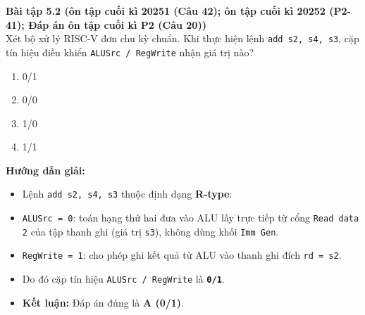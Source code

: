 \textbf{Bài tập 5.2 (ôn tập cuối kì 20251 (Câu 42); ôn tập cuối kì 20252 (P2-41); Đáp án ôn tập cuối kì P2 (Câu 20))}\\
Xét bộ xử lý RISC-V đơn chu kỳ chuẩn. Khi thực hiện lệnh \texttt{add s2, s4, s3}, cặp tín hiệu điều khiển \texttt{ALUSrc / RegWrite} nhận giá trị nào?
\begin{enumerate}[label=\Alph*.]
    \item 0/1
    \item 0/0
    \item 1/0
    \item 1/1
\end{enumerate}
\textbf{Hướng dẫn giải:}
\begin{itemize}
    \item Lệnh \texttt{add s2, s4, s3} thuộc định dạng \textbf{R-type}:
    \item \texttt{ALUSrc = 0}: toán hạng thứ hai đưa vào ALU lấy trực tiếp từ cổng \texttt{Read data 2} của tập thanh ghi (giá trị \texttt{s3}), không dùng khối \texttt{Imm Gen}.
    \item \texttt{RegWrite = 1}: cho phép ghi kết quả từ ALU vào thanh ghi đích \texttt{rd = s2}.
    \item Do đó cặp tín hiệu \texttt{ALUSrc / RegWrite} là \textbf{\texttt{0/1}}.
    \item \textbf{Kết luận:} Đáp án đúng là \textbf{A (0/1)}.
\end{itemize}

